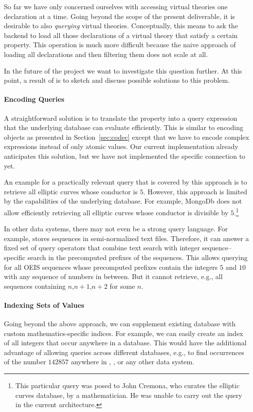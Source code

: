 So far we have only concerned ourselves with accessing virtual theories one declaration at a time.
Going beyond the scope of the present deliverable, it is desirable to also \emph{querying} virtual theories.
Conceptually, this means to ask the \MMT backend to load all those declarations of a virtual theory that satisfy a certain property.
This operation is much more difficult because the naive approach of loading all declarations and then filtering them does not scale at all.

In the future of the \pn project we want to investigate this question further.
At this point, a result of \pn is to sketch and discuss possible solutions to this problem.

\paragraph{Encoding Queries}
A straightforward solution is to translate the property into a query expression that the underlying database can evaluate efficiently.
This is similar to encoding objects as presented in Section~\ref{sec:codec} except that we have to encode complex expressions instead of only atomic values.
Our current implementation already anticipates this solution, but we have not implemented the specific connection to \LMFDB yet.

An example for a practically relevant query that is covered by this approach is to retrieve all elliptic curves whose conductor is $5$.
However, this approach is limited by the capabilities of the underlying database.
For example, MongoDb does not allow efficiently retrieving all elliptic curves whose conductor is divisible by $5$.\footnote{This particular query was posed to John Cremona, who curates the elliptic curves database, by a mathematician. He was unable to carry out the query in the current architecture.}

In other data systems, there may not even be a strong query language.
For example, \OEIS stores sequences in semi-normalized text files.
Therefore, it can answer a fixed set of query operators that combine text search with integer sequence--specific search in the precomputed prefixes of the sequences.
This allows querying for all OEIS sequences whose precomputed prefixes contain the integers $5$ and $10$ with any sequence of numbers in between.
But it cannot retrieve, e.g., all sequences containing $n$,$n+1$,$n+2$ for some $n$.

\paragraph{Indexing Sets of Values}
Going beyond the above approach, we can supplement existing database with custom mathematics-specific indices.
For example, we can easily create an index of all integers that occur anywhere in a database.
This would have the additional advantage of allowing queries across different databases, e.g., to find occurrences of the number $142857$ anywhere in \LMFDB, \OEIS, or any other data system.

